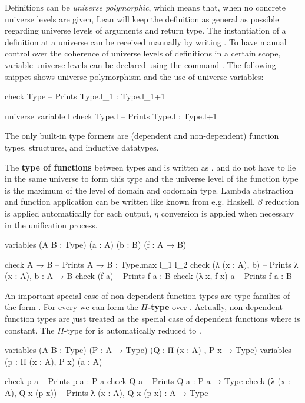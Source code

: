 Definitions can be \emph{universe polymorphic}, which means that, when no concrete
universe levels are given, Lean will keep the definition as general as possible
regarding universe levels of arguments and return type.
The instantiation of a definition  at a universe  can be received
manually by writing .
To have manual control over the coherence of universe levels of definitions in
a certain scope, variable universe levels can be declared using the command
. The following snippet shows universe polymorphism
and the use of universe variables:
\begin{leancode}
check Type -- Prints Type.{l_1} : Type.{l_1+1}

universe variable l
check Type.{l} -- Prints Type.{l} : Type.{l+1}
\end{leancode}

The only built-in type formers are (dependent and non-dependent) function types,
structures, and inductive datatypes.

The \textbf{type of functions} between types  and  is written
as .
 and  do not have to lie in the same universe to form this type
and the universe level of the function type is the maximum of the level of domain
and codomain type.
Lambda abstraction and function application can be written like known from e.g.
Haskell.
$\beta$ reduction is applied automatically for each output, $\eta$ conversion is
applied when necessary in the unification process.
\begin{leancode}
variables (A B : Type) (a : A) (b : B) (f : A → B)

check A → B -- Prints A → B : Type.{max l_1 l_2}
check (λ (x : A), b) -- Prints λ (x : A), b : A → B
check (f a) -- Prints f a : B
check (λ x, f x) a -- Prints f a : B
\end{leancode}

An important special case of non-dependent function types are type families
of the form . For every  we can form the
\textbf{$\Pi$-type}  over .
Actually, non-dependent function types are just treated as the special case of
dependent functions where  is constant.
The $\Pi$-type  for  is automatically reduced
to .
\begin{leancode}
variables (A B : Type) (P : A → Type) (Q : Π (x : A) , P x → Type)
variables (p : Π (x : A), P x) (a : A)

check p a -- Prints p a : P a
check Q a -- Prints Q a : P a → Type
check (λ (x : A), Q x (p x)) -- Prints λ (x : A), Q x (p x) : A → Type
\end{leancode}

